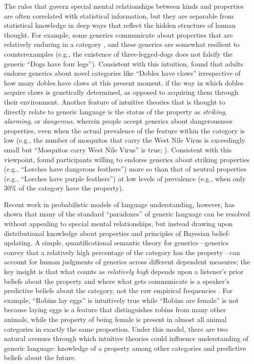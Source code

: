 \documentclass[floatsintext, 11pt, doc]{apa6}
\begin{document}
The rules that govern special mental relationships between kinds and properties are often correlated with statistical information, but they are separable from statistical knowledge in deep ways that reflect the hidden structure of human thought.
For example, some generics communicate about properties that are relatively enduring in a category \cite{Lyons1977, Prasada2006}, and these generics are somewhat resilient to counterexamples (e.g., the existence of three-legged-dogs does not falsify the generic ``Dogs have four legs'').
Consistent with this intuition,  found that adults endorse generics about novel categories like ``Dobles have claws'' irrespective of how many dobles have claws at this present moment, if the way in which dobles acquire claws is genetically determined, as opposed to acquiring them through their environment.
Another feature of intuitive theories that is thought to directly relate to generic language is the status of the property as \emph{striking}, \emph{alarming}, or \emph{dangerous}, wherein people accept generics about dangerousness properties, even when the actual prevalence of the feature within the category is low (e.g., the number of mosquitos that carry the West Nile Virus is exceedingly small but ``Mosquitos carry West Nile Virus'' is true; ). 
Consistent with this viewpoint,  found participants willing to endorse generics about striking properties (e.g., ``Lorches have dangerous feathers'') more so than that of neutral properties (e.g., ``Lorches have purple feathers'') at low levels of prevalence (e.g., when only 30\% of the category have the property).

Recent work in probabilistic models of language understanding, however, has shown that many of the standard ``paradoxes'' of generic language can be resolved without appealing to special mental relationships, but instead drawing upon distributional knowledge about properties and principles of Bayesian belief-updating.
A simple, quantificational semantic theory for generics---generics convey that a relatively high percentage of the category has the property---can account for human judgments of generics across different dependent measures; the key insight is that what counts as \emph{relatively high} depends upon a listener's prior beliefs about the property and where what gets communicate is a speaker's predictive beliefs about the category, not the raw empirical frequencies \cite{Tessler2019}. %
For example, ``Robins lay eggs'' is intuitively true while ``Robins are female'' is not because laying eggs is a feature that distinguishes robins from many other animals, while the property of being female is present in almost all animal categories in exactly the same proportion.
Under this model, there are two natural avenues through which intuitive theories could influence understanding of generic language: knowledge of a property among other categories and predictive beliefs about the future. 
\end{document}
